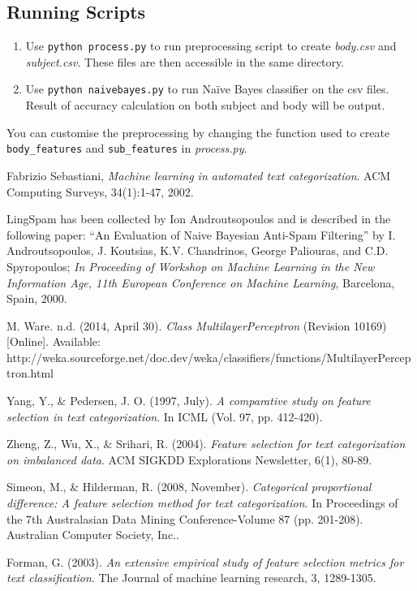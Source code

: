 \documentclass[10pt, a4paper]{article}
\begin{document}
\subsection{Running Scripts}

\begin{enumerate}
\item Use \verb|python process.py| to run preprocessing script to create \textit{body.csv} and \textit{subject.csv}. These files are then accessible in the same directory.
\item Use \verb|python naivebayes.py| to run Na\"ive Bayes classifier on the csv files. Result of accuracy calculation on both subject and body will be output.
\end{enumerate}

You can customise the preprocessing by changing the function used to create \verb|body_features| and \verb|sub_features| in \textit{process.py}.

\begin{thebibliography}{9}

  Fabrizio Sebastiani, \emph{Machine learning in automated text categorization}. ACM Computing Surveys, 34(1):1-47, 2002.

LingSpam has been collected by Ion Androutsopoulos and is described in the following paper: ``An Evaluation of Naive Bayesian Anti-Spam Filtering'' by I. Androutsopoulos, J. Koutsias, K.V. Chandrinos, George Paliouras, and C.D. Spyropoulos; \textit{In Proceeding of Workshop on Machine Learning in the New Information Age, 11th European Conference on Machine Learning}, Barcelona, Spain, 2000.

M. Ware. n.d. (2014, April 30). \emph{Class MultilayerPerceptron} (Revision 10169) [Online]. Available: http://weka.sourceforge.net/doc.dev/weka/classifiers/functions/MultilayerPerceptron.html

Yang, Y., \& Pedersen, J. O. (1997, July). \emph{A comparative study on feature selection in text categorization}. In ICML (Vol. 97, pp. 412-420).

Zheng, Z., Wu, X., \& Srihari, R. (2004). \emph{Feature selection for text categorization on imbalanced data}. ACM SIGKDD Explorations Newsletter, 6(1), 80-89.

Simeon, M., \& Hilderman, R. (2008, November). \emph{Categorical proportional difference: A feature selection method for text categorization}. In Proceedings of the 7th Australasian Data Mining Conference-Volume 87 (pp. 201-208). Australian Computer Society, Inc..



Forman, G. (2003). \emph{An extensive empirical study of feature selection metrics for text classification}. The Journal of machine learning research, 3, 1289-1305.

\end{thebibliography}
\end{document}
